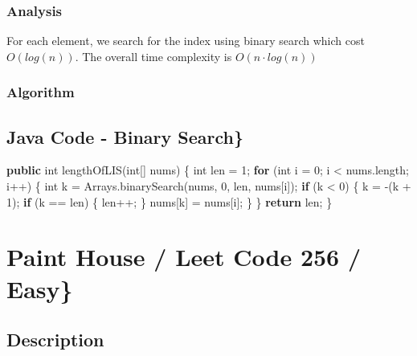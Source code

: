 \documentclass[]{book}
\newenvironment{Shaded}{\begin{snugshade}}{\end{snugshade}}
\newcommand{\BuiltInTok}[1]{#1}
\newcommand{\DataTypeTok}[1]{\textcolor[rgb]{0.13,0.29,0.53}{#1}}
\newcommand{\DecValTok}[1]{\textcolor[rgb]{0.00,0.00,0.81}{#1}}
\newcommand{\FunctionTok}[1]{\textcolor[rgb]{0.00,0.00,0.00}{#1}}
\newcommand{\KeywordTok}[1]{\textcolor[rgb]{0.13,0.29,0.53}{\textbf{#1}}}
\newcommand{\NormalTok}[1]{#1}
\begin{document}
\hypertarget{analysis-30}{%
\subsubsection{Analysis}\label{analysis-30}}

For each element, we search for the index using binary search which cost \(O(log(n))\). The overall time complexity is
\(O(n \cdot log(n))\)

\hypertarget{algorithm-30}{%
\subsubsection{Algorithm}\label{algorithm-30}}

\hypertarget{java-code---binary-search}{%
\subsection{Java Code - Binary Search\}}\label{java-code---binary-search}}

\begin{Shaded}
\begin{Highlighting}[]
\KeywordTok{public} \DataTypeTok{int} \FunctionTok{lengthOfLIS}\NormalTok{(}\DataTypeTok{int}\NormalTok{[] nums) \{}
    \DataTypeTok{int}\NormalTok{ len = }\DecValTok{1}\NormalTok{;}
    \KeywordTok{for}\NormalTok{ (}\DataTypeTok{int}\NormalTok{ i = }\DecValTok{0}\NormalTok{; i < nums.}\FunctionTok{length}\NormalTok{; i++) \{}
        \DataTypeTok{int}\NormalTok{ k = }\BuiltInTok{Arrays}\NormalTok{.}\FunctionTok{binarySearch}\NormalTok{(nums, }\DecValTok{0}\NormalTok{, len, nums[i]);}
        \KeywordTok{if}\NormalTok{ (k < }\DecValTok{0}\NormalTok{) \{}
\NormalTok{            k = -(k + }\DecValTok{1}\NormalTok{);}
            \KeywordTok{if}\NormalTok{ (k == len) \{}
\NormalTok{                len++;}
\NormalTok{            \}}
\NormalTok{            nums[k] = nums[i];}
\NormalTok{        \}}
\NormalTok{    \}}
    \KeywordTok{return}\NormalTok{ len;}
\NormalTok{\}}
\end{Highlighting}
\end{Shaded}

\hypertarget{paint-house-leet-code-256-easy}{%
\section{Paint House / Leet Code 256 / Easy\}}\label{paint-house-leet-code-256-easy}}

\hypertarget{description-29}{%
\subsection{Description}\label{description-29}}
\end{document}
